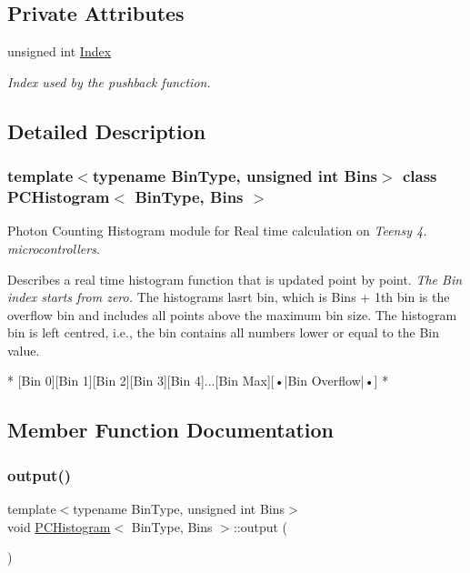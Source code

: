 \subsection*{Private Attributes}
\begin{DoxyCompactItemize}
\item 
unsigned int \hyperlink{classPCHistogram_a3d0371659763511d752c3348db978f79}{Index}
\begin{DoxyCompactList}\small\item\em Index used by the pushback function. \end{DoxyCompactList}\end{DoxyCompactItemize}


\subsection{Detailed Description}
\subsubsection*{template$<$typename Bin\+Type, unsigned int Bins$>$\newline
class P\+C\+Histogram$<$ Bin\+Type, Bins $>$}

Photon Counting Histogram module for Real time calculation on {\itshape Teensy 4. microcontrollers}. 

Describes a real time histogram function that is updated point by point. {\itshape The Bin index starts from zero.} The histogram\textquotesingle{}s lasrt bin, which is {\ttfamily Bins + 1}th bin is the overflow bin and includes all points above the maximum bin size. The histogram bin is left centred, i.\+e., the bin contains all numbers lower or equal to the Bin value. \begin{DoxyVerb}* [Bin 0][Bin 1][Bin 2][Bin 3][Bin 4]...[Bin Max][•|Bin Overflow|•]
* \end{DoxyVerb}
 

\subsection{Member Function Documentation}
\mbox{\label{classPCHistogram_af4391ac8ad3f4d9865ee6335fb563b4c}} 
\subsubsection{\texorpdfstring{output()}{output()}}
{\footnotesize\ttfamily template$<$typename Bin\+Type, unsigned int Bins$>$ \\
void \hyperlink{classPCHistogram}{P\+C\+Histogram}$<$ Bin\+Type, Bins $>$\+::output (\begin{DoxyParamCaption}{ }\end{DoxyParamCaption})\hspace{0.3cm}{\ttfamily [inline]}}



